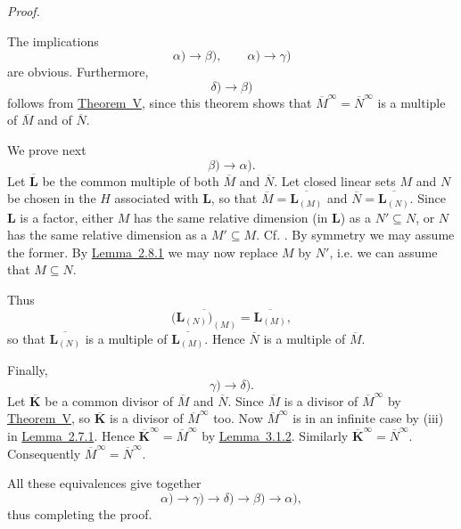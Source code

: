 \documentclass[b5paper,twoside]{article}
\newcommand{\thmref}[2]{\hyperref[#1]{\mbox{Theorem~#2}}}
\newcommand{\lemref}[2]{\hyperref[#1]{\mbox{Lemma~#2}}}
\theoremstyle{mvnplain}
\renewenvironment{proof}[1][Proof]{%
  \par\addvspace{0.35\baselineskip}%
  \noindent\textit{#1.}\ \normalfont\ignorespaces
}{%
  \par\addvspace{0.35\baselineskip}%
}
\newcommand{\M}{\mathbf M}
\newcommand{\N}{\mathbf N}
\newcommand{\Hilbert}{\mathfrak H}
\def\M{M}%
\def\N{N}%
\def\Hilbert{H}%
\def\mathfrak#1{#1}%
\begin{document}
\begin{proof}
The implications
\[
  \alpha)\longrightarrow\beta),\qquad
  \alpha)\longrightarrow\gamma)
\]
are obvious. Furthermore,
\[
  \delta)\longrightarrow\beta)
\]
follows from \thmref{thm:V}{V}, since this theorem shows that
\(\overline{\M}^{\infty}=\overline{\N}^{\infty}\) is a multiple of
\(\overline{\M}\) and of \(\overline{\N}\).

We prove next
\[
  \beta)\longrightarrow\alpha).
\]
Let \(\overline{\mathbf L}\) be the common multiple of both \(\overline{\M}\) and
\(\overline{\N}\). Let closed linear sets \(\mathfrak M\) and
\(\mathfrak N\) be chosen in the \(\Hilbert\) associated with \(\mathbf L\), so that
\(\overline{\M}=\overline{\mathbf L_{(\mathfrak M)}}\) and
\(\overline{\N}=\overline{\mathbf L_{(\mathfrak N)}}\). Since \(\mathbf L\) is a factor,
either \(\mathfrak M\) has the same relative dimension (in \(\mathbf L\)) as a
\(\mathfrak N'\subseteq\mathfrak N\), or \(\mathfrak N\) has the same relative
dimension as a \(\mathfrak M'\subseteq\mathfrak M\). Cf.
\cite[p.~153, Lemma~6.2.3, or p.~154, Theorem~VI]{ref5}. By symmetry we may
assume the former. By \lemref{lem:2.8.1}{2.8.1} we may now replace
\(\mathfrak M\) by \(\mathfrak N'\), i.e. we can assume that
\(\mathfrak M\subseteq\mathfrak N\).

Thus
\[
  \overline{\bigl(\mathbf L_{(\mathfrak N)}\bigr)_{(\mathfrak M)}}
  =\overline{\mathbf L_{(\mathfrak M)}},
\]
so that \(\overline{\mathbf L_{(\mathfrak N)}}\) is a multiple of
\(\overline{\mathbf L_{(\mathfrak M)}}\). Hence \(\overline{\N}\) is a multiple of
\(\overline{\M}\).

Finally,
\[
  \gamma)\longrightarrow\delta).
\]
Let \(\overline{\mathbf K}\) be a common divisor of \(\overline{\M}\) and
\(\overline{\N}\). Since \(\overline{\M}\) is a divisor of
\(\overline{\M}^{\infty}\) by \thmref{thm:V}{V}, so
\(\overline{\mathbf K}\) is a divisor of \(\overline{\M}^{\infty}\) too. Now
\(\overline{\M}^{\infty}\) is in an infinite case by (iii) in
\lemref{lem:2.7.1}{2.7.1}. Hence
\(\overline{\mathbf K}^{\infty}=\overline{\M}^{\infty}\) by
\lemref{lem:3.1.2}{3.1.2}. Similarly
\(\overline{\mathbf K}^{\infty}=\overline{\N}^{\infty}\). Consequently
\(\overline{\M}^{\infty}=\overline{\N}^{\infty}\).

All these equivalences give together
\[
  \alpha)\longrightarrow\gamma)\longrightarrow\delta)
  \longrightarrow\beta)\longrightarrow\alpha),
\]
thus completing the proof.
\end{proof}
\end{document}
